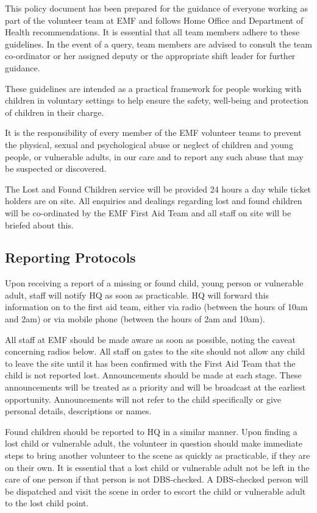 This policy document has been prepared for the guidance of everyone working as
part of the volunteer team at EMF and follows Home Office and Department of
Health recommendations. It is essential that all team members adhere to these
guidelines. In the event of a query, team members are advised to consult the
team co-ordinator or her assigned deputy or the appropriate shift leader for
further guidance.

These guidelines are intended as a practical framework for people working with
children in voluntary settings to help ensure the safety, well-being and
protection of children in their charge.

It is the responsibility of every member of the EMF volunteer teams to prevent
the physical, sexual and psychological abuse or neglect of children and young
people, or vulnerable adults, in our care and to report any such abuse that may
be suspected or discovered.

The Lost and Found Children service will be provided 24 hours a day while
ticket holders are on site. All enquiries and dealings regarding lost and found
children will be co-ordinated by the EMF First Aid Team and all staff on site
will be briefed about this.

\subsection{Reporting Protocols}
Upon receiving a report of a missing or found child, young person or vulnerable
adult, staff will notify HQ as soon as practicable. HQ will forward this
information on to the first aid team, either via radio (between the hours of
10am and 2am) or via mobile phone (between the hours of 2am and 10am).

All staff at EMF should be made aware as soon as possible, noting the
caveat concerning radios below. All staff on gates to the site should not allow
any child to leave the site until it has been confirmed with the First Aid Team
that the child is not reported lost. Announcements should be made at each
stage. These announcements will be treated as a priority and will be broadcast
at the earliest opportunity. Announcements will not refer to the child
specifically or give personal details, descriptions or names.

Found children should be reported to HQ in a similar manner. Upon
finding a lost child or vulnerable adult, the volunteer in question should make
immediate steps to bring another volunteer to the scene as quickly as
practicable, if they are on their own. It is essential that a lost child or
vulnerable adult not be left in the care of one person if that person is not
DBS-checked. A DBS-checked person will be dispatched and visit the scene in
order to escort the child or vulnerable adult to the lost child point.

